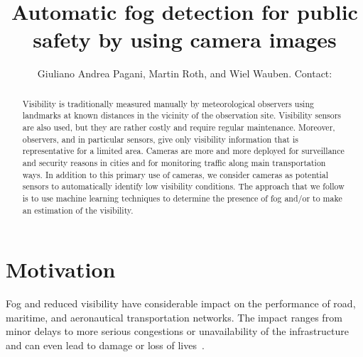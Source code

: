\documentclass{article}
\title{Automatic fog detection for public safety by using camera images}
\author{Giuliano Andrea Pagani\affil{1}, Martin Roth\affil{1}, and Wiel Wauben\affil{1}. Contact: \email{pagani@knmi.nl}}
\begin{document}
\maketitle

\begin{abstract}
Visibility is traditionally measured manually by meteorological observers using landmarks at known distances in
the vicinity of the observation site. 
Visibility sensors are also used, but they are rather costly and
require regular maintenance. Moreover, observers, and in particular sensors, give only visibility information that is
representative for a limited area. 
Cameras are more and more deployed for surveillance and security reasons in cities and for monitoring traffic along
main transportation ways. In addition to this primary use of cameras, we consider cameras as potential sensors to
automatically identify low visibility conditions. 
The approach that we follow is to use machine learning techniques
to determine the presence of fog and/or to make an estimation of the visibility. 
\end{abstract}

\bcols %

\section*{Motivation}
Fog and reduced visibility have considerable impact on the performance of road, maritime, and aeronautical transportation
networks. The impact ranges from minor delays to more serious congestions or unavailability of the
infrastructure and can even lead to damage or loss of lives~\cite{gultepe2007fog}.
\end{document}
